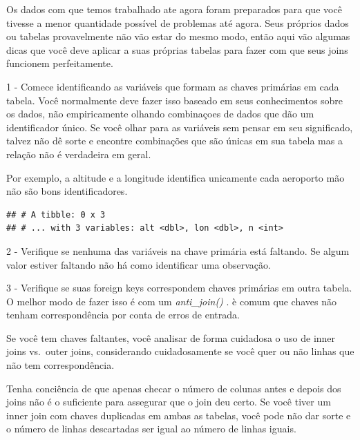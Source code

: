 \documentclass[
]{article}
\newenvironment{Shaded}{\begin{snugshade}}{\end{snugshade}}
\newcommand{\DecValTok}[1]{\textcolor[rgb]{0.00,0.00,0.81}{#1}}
\newcommand{\KeywordTok}[1]{\textcolor[rgb]{0.13,0.29,0.53}{\textbf{#1}}}
\newcommand{\NormalTok}[1]{#1}
\newcommand{\OperatorTok}[1]{\textcolor[rgb]{0.81,0.36,0.00}{\textbf{#1}}}
\newcommand{\StringTok}[1]{\textcolor[rgb]{0.31,0.60,0.02}{#1}}
\begin{document}
Os dados com que temos trabalhado ate agora foram preparados para que
você tivesse a menor quantidade possível de problemas até agora. Seus
próprios dados ou tabelas provavelmente não vão estar do mesmo modo,
então aqui vão algumas dicas que você deve aplicar a suas próprias
tabelas para fazer com que seus joins funcionem perfeitamente.

1 - Comece identificando as variáveis que formam as chaves primárias em
cada tabela. Você normalmente deve fazer isso baseado em seus
conhecimentos sobre os dados, não empiricamente olhando combinaçoes de
dados que dão um identificador único. Se você olhar para as variáveis
sem pensar em seu significado, talvez não dê sorte e encontre
combinações que são únicas em sua tabela mas a relação não é verdadeira
em geral.

Por exemplo, a altitude e a longitude identifica unicamente cada
aeroporto mão não são bons identificadores.

\begin{Shaded}
\end{Shaded}

\begin{verbatim}
## # A tibble: 0 x 3
## # ... with 3 variables: alt <dbl>, lon <dbl>, n <int>
\end{verbatim}

2 - Verifique se nenhuma das variáveis na chave primária está faltando.
Se algum valor estiver faltando não há como identificar uma observação.

3 - Verifique se suas foreign keys correspondem chaves primárias em
outra tabela. O melhor modo de fazer isso é com um \emph{anti\_join()} .
è comum que chaves não tenham correspondência por conta de erros de
entrada.

Se você tem chaves faltantes, você analisar de forma cuidadosa o uso de
inner joins vs.~outer joins, considerando cuidadosamente se você quer ou
não linhas que não tem correspondência.

Tenha conciência de que apenas checar o número de colunas antes e depois
dos joins não é o suficiente para assegurar que o join deu certo. Se
você tiver um inner join com chaves duplicadas em ambas as tabelas, você
pode não dar sorte e o número de linhas descartadas ser igual ao número
de linhas iguais.
\end{document}
